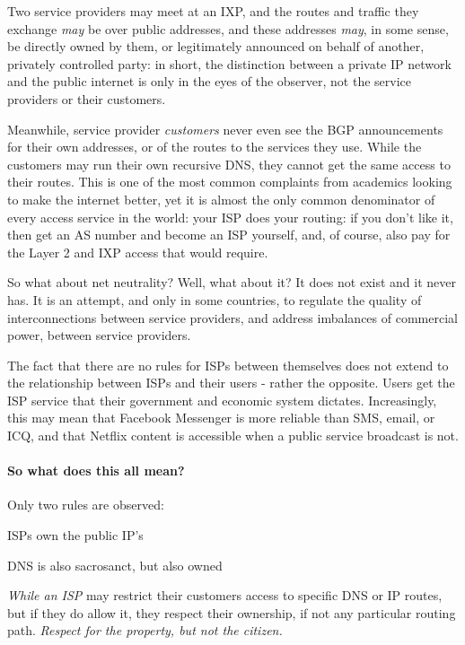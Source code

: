 Two service providers may meet at an IXP, and the routes and traffic they exchange \textit{may} be over public addresses, and these addresses \textit{may}, in some sense, be directly owned by them, or legitimately announced on behalf of another, privately controlled party: in short, the distinction between a private IP network and the public internet is only in the eyes of the observer, not the service providers or their customers.


Meanwhile, service provider \textit{customers} never even see the BGP announcements for their own addresses, or of the routes to the services they use.
While the customers may run their own recursive DNS, they cannot get the same access to their routes. This is one of the most common complaints from academics looking to make the internet better, yet it is almost the only common denominator of every access service in the world: your ISP does your routing: if you don't like it, then get an AS number and become an ISP yourself, and, of course, also pay for the Layer 2 and IXP access that would require.

So what about net neutrality? Well, what about it? It does not exist and it never has. It is an attempt, and only in some countries, to regulate the quality of interconnections between service providers, and address imbalances of commercial power, between service providers. 

The fact that there are no rules for ISPs between themselves does not extend to the relationship between ISPs and their users - rather the opposite. Users get the ISP service that their government and economic system dictates. Increasingly, this may mean that Facebook Messenger is more reliable than SMS, email, or ICQ, and that Netflix content is accessible when a public service broadcast is not.

\paragraph{So what does this all mean?}
 Only two rules are observed:
  \begin{myitemize}
      \item ISPs own the public IP's
      \item DNS is also sacrosanct, but also owned
     \end{myitemize}
  
 \textit{ While an ISP} may restrict their customers access to specific DNS or IP routes, but if they do allow it, they respect their ownership, if not any particular routing path.   \textit{Respect for the property, but not the citizen.}


